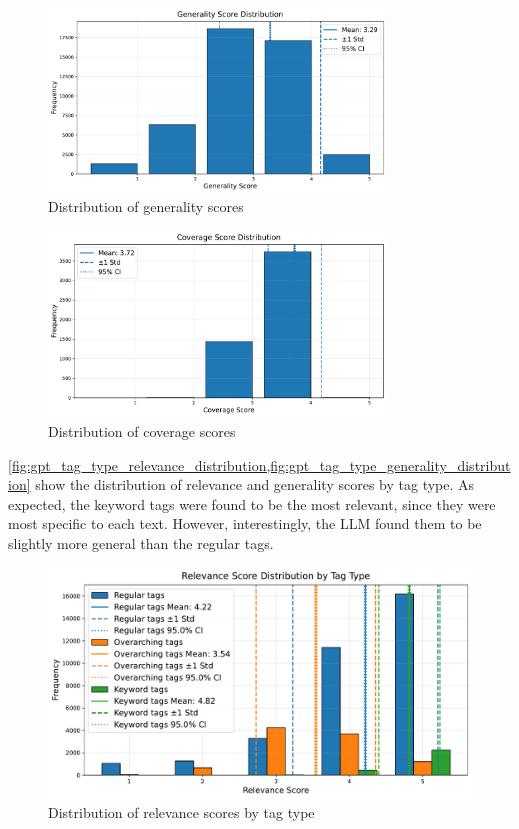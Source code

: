 \begin{figure}[h]
    \centering
    \includegraphics[width=0.8\textwidth]{figures/gpt_generality_score_distribution.pdf}
    \caption{Distribution of generality scores}
    \label{fig:gpt_generality_score_distribution}
\end{figure}

\begin{figure}[h]
    \centering
    \includegraphics[width=0.8\textwidth]{figures/gpt_coverage_score_distribution.pdf}
    \caption{Distribution of coverage scores}
    \label{fig:gpt_coverage_score_distribution}
\end{figure}

\cref{fig:gpt_tag_type_relevance_distribution,fig:gpt_tag_type_generality_distribution} show the distribution of relevance and generality scores by tag type. As expected, the keyword tags were found to be the most relevant, since they were most specific to each text. However, interestingly, the LLM found them to be slightly more general than the regular tags.

\begin{figure}[h]
    \centering
    \includegraphics[width=1\textwidth]{figures/relevance_distribution.pdf}
    \caption{Distribution of relevance scores by tag type}
    \label{fig:gpt_tag_type_relevance_distribution}
\end{figure}

